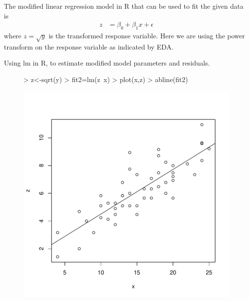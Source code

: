 \documentclass[12pt]{article}
\begin{document}
\item
The modified linear regression model in R that can be used to fit the given data is 
\begin{equation*}
\begin{aligned}
z &= \beta_0 + \beta_1 x + \epsilon
\end{aligned}
\end{equation*}
where $z=\sqrt{y}$ is the transformed response variable. Here we are using the power transform on the response variable as indicated by EDA.
\item Using lm in R, to estimate modified model parameters and residuals.
\begin{figure}[H]
\begin{Schunk}
\begin{Sinput}
> z<-sqrt(y)
> fit2=lm(z~x)
> plot(x,z)
> abline(fit2)
\end{Sinput}
\end{Schunk}
\includegraphics{HW3-012}
\end{figure}
\end{document}

